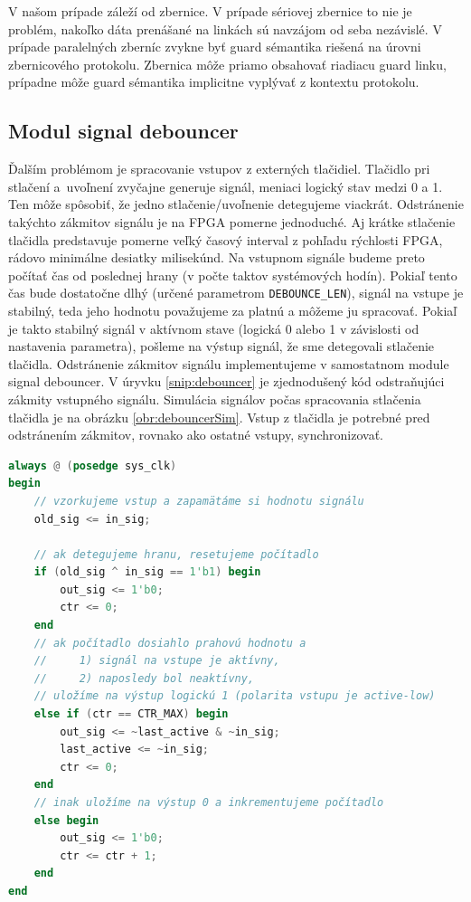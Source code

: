 V našom prípade záleží od zbernice. V prípade sériovej zbernice to nie je problém, nakoľko dáta prenášané na linkách sú navzájom od seba nezávislé. V prípade paralelných zberníc zvykne byť guard sémantika riešená na úrovni zbernicového protokolu. Zbernica môže priamo obsahovať riadiacu guard linku, prípadne môže guard sémantika implicitne vyplývať z kontextu protokolu.

\subsection{Modul signal debouncer} \label{subsek:debouncer}
Ďalším problémom je spracovanie vstupov z externých tlačidiel. Tlačidlo pri stlačení a~uvoľnení zvyčajne generuje  signál, meniaci logický stav medzi 0 a 1. Ten môže spôsobiť, že jedno stlačenie/uvoľnenie detegujeme viackrát. Odstránenie takýchto zákmitov signálu je na FPGA pomerne jednoduché. Aj krátke stlačenie tlačidla predstavuje pomerne veľký časový interval z pohľadu rýchlosti FPGA, rádovo minimálne desiatky milisekúnd. Na vstupnom signále budeme preto počítať čas od poslednej hrany (v počte taktov systémových hodín). Pokiaľ tento čas bude dostatočne dlhý (určené parametrom \texttt{DEBOUNCE\_LEN}), signál na vstupe je stabilný, teda jeho hodnotu považujeme za platnú a môžeme ju spracovať. Pokiaľ je takto stabilný signál v aktívnom stave (logická 0 alebo 1 v závislosti od nastavenia parametra), pošleme na výstup signál, že sme detegovali stlačenie tlačidla. Odstránenie zákmitov signálu implementujeme v samostatnom module signal debouncer. V úryvku \ref{snip:debouncer} je zjednodušený kód odstraňujúci zákmity vstupného signálu. Simulácia signálov počas spracovania stlačenia tlačidla je na obrázku \ref{obr:debouncerSim}. Vstup z tlačidla je potrebné pred odstránením zákmitov, rovnako ako ostatné vstupy, synchronizovať.

\begin{lstlisting}[float,language=Verilog,caption={Zjednodušený kód pre odstránenie zákmitov signálu \texttt{in\_sig}. V príklade je polarita vstupu invertovaná (tzv. active-low).},label=snip:debouncer]
always @ (posedge sys_clk)
begin
    // vzorkujeme vstup a zapamätáme si hodnotu signálu
	old_sig <= in_sig;
		
    // ak detegujeme hranu, resetujeme počítadlo
    if (old_sig ^ in_sig == 1'b1) begin
        out_sig <= 1'b0;
        ctr <= 0;
    end
    // ak počítadlo dosiahlo prahovú hodnotu a
    //     1) signál na vstupe je aktívny,
    //     2) naposledy bol neaktívny,
    // uložíme na výstup logickú 1 (polarita vstupu je active-low)
    else if (ctr == CTR_MAX) begin
        out_sig <= ~last_active & ~in_sig;
        last_active <= ~in_sig;
        ctr <= 0;
    end
    // inak uložíme na výstup 0 a inkrementujeme počítadlo
    else begin
        out_sig <= 1'b0;
        ctr <= ctr + 1;
	end
end
\end{lstlisting}

